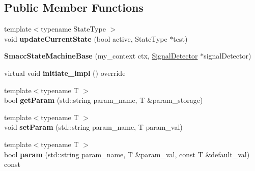 \subsection*{Public Member Functions}
\begin{DoxyCompactItemize}
\item 
\mbox{\label{structsmacc_1_1SmaccStateMachineBase_a0a172afd49d485bbc4e008ccff410683}} 
{\footnotesize template$<$typename State\+Type $>$ }\\void {\bfseries update\+Current\+State} (bool active, State\+Type $\ast$test)
\item 
\mbox{\label{structsmacc_1_1SmaccStateMachineBase_a47508a2d301007546d4c70dedd2ade4b}} 
{\bfseries Smacc\+State\+Machine\+Base} (my\+\_\+context ctx, \hyperlink{classsmacc_1_1SignalDetector}{Signal\+Detector} $\ast$signal\+Detector)
\item 
\mbox{\label{structsmacc_1_1SmaccStateMachineBase_a2dc1cd9a25b80f00602f1faab9b01e7b}} 
virtual void {\bfseries initiate\+\_\+impl} () override
\item 
\mbox{\label{structsmacc_1_1SmaccStateMachineBase_a5529364d7f90edb802221536402e838a}} 
{\footnotesize template$<$typename T $>$ }\\bool {\bfseries get\+Param} (std\+::string param\+\_\+name, T \&param\+\_\+storage)
\item 
\mbox{\label{structsmacc_1_1SmaccStateMachineBase_a30d76661005a2bdff68c802cdab42fcf}} 
{\footnotesize template$<$typename T $>$ }\\void {\bfseries set\+Param} (std\+::string param\+\_\+name, T param\+\_\+val)
\item 
\mbox{\label{structsmacc_1_1SmaccStateMachineBase_af055b503117bb541edc93c8f0709b77e}} 
{\footnotesize template$<$typename T $>$ }\\bool {\bfseries param} (std\+::string param\+\_\+name, T \&param\+\_\+val, const T \&default\+\_\+val) const
\item 
\mbox{\label{structsmacc_1_1SmaccStateMachineBase_ada55ce7b64579bd74f79302f3d587624}} 

\end{DoxyCompactItemize}

